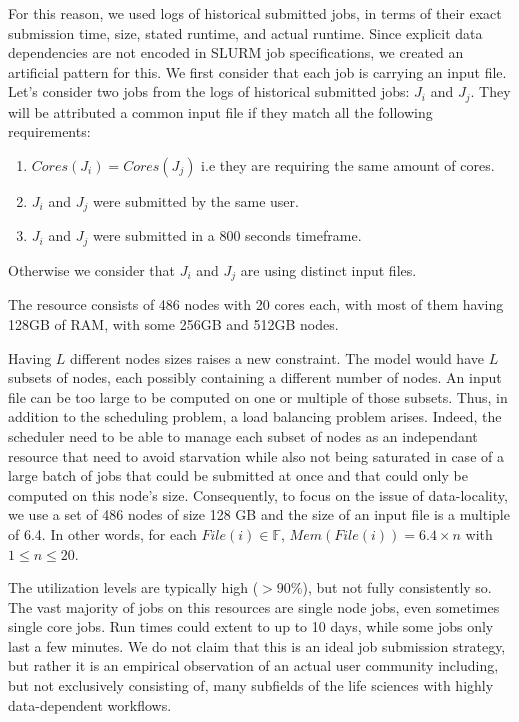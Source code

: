\documentclass[conference,10pt]{IEEEtran}
\newcommand{\file}{\ensuremath{\mathit{File}}\xspace}
\newcommand{\memory}{\ensuremath{\mathit{Mem}}\xspace}
\newcommand{\core}{\mathit{Cores}\xspace}
\newcommand{\fileset}{\ensuremath{\mathbb{F}}\xspace}
\begin{document}
For this reason, we used logs of historical submitted jobs, in terms of their exact submission time, size, stated runtime, and actual runtime.
Since explicit data dependencies are not encoded in SLURM job specifications, we created an artificial pattern for this. 
We first consider that each job is carrying an input file.
Let's consider two jobs from the logs of historical submitted jobs: $J_i$ and $J_j$.
They will be attributed a common input file if they match all the following requirements:
\begin{enumerate}
	\item $\core(J_i) = \core(J_j)$ i.e they are requiring the same amount of cores.
	\item $J_i$ and $J_j$ were submitted by the same user.
	\item $J_i$ and $J_j$ were submitted in a 800 seconds timeframe.
\end{enumerate}
Otherwise we consider that $J_i$ and $J_j$ are using distinct input files.

The resource consists of 486 nodes with 20 cores each, with most of them having 128GB of RAM, with some 256GB and 512GB nodes. 

Having $L$ different nodes sizes raises a new constraint. The model would have
$L$ subsets of nodes, each possibly containing a different number of nodes.
An input file can be too large to be computed on one or multiple of those subsets.
Thus, in addition to the scheduling problem, a load balancing problem arises.
Indeed, the scheduler need to be able to manage each subset of nodes as an independant 
resource that need to avoid starvation while also not being saturated in case of a large
batch of jobs that could be submitted at once and that could only be computed on this node's size.
Consequently, to focus on the issue of data-locality, we use a set of 486 nodes of size 
128 GB and the size of an input file is a multiple of 6.4.
In other words, for each $\file(i) \in \fileset$, $\memory(\file(i)) = 6.4 \times n$ with 
$1 \leq n \leq 20$.

The utilization levels are typically high ($>90\%$), but
not fully consistently so. The vast majority of jobs on this resources are single node jobs, even sometimes single core jobs. Run times
could extent to up to 10 days, while some jobs only last a few minutes. We do not claim that this is an ideal job submission strategy,
but rather it is an empirical observation of an actual user community including, but not exclusively consisting of, many subfields of the life sciences with highly data-dependent workflows.
\end{document}
